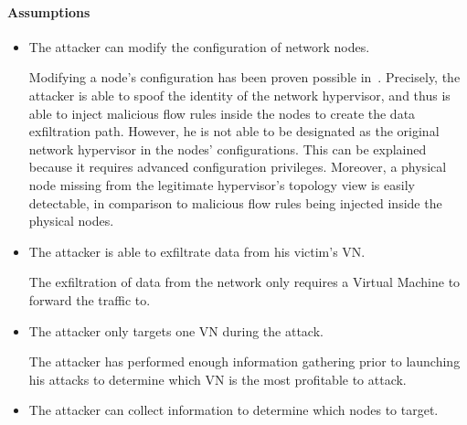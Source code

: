 \paragraph{Assumptions}
\begin{itemize}
    \item The attacker can modify the configuration of network nodes.
    
    Modifying a node's configuration has been proven  possible in~\cite{Taxonomy_Hizver2015, Bokani2015, attain-Ujcich2017}. Precisely, the attacker is able to spoof the identity of the network hypervisor, and thus is able to inject malicious flow rules inside the nodes to create the data exfiltration path. 
    However, he is not able to be designated as the original network hypervisor in the nodes' configurations. 
    This can be explained because it requires advanced configuration privileges. Moreover, a physical node missing from the legitimate hypervisor's topology view is easily detectable, in comparison to malicious flow rules being injected inside the physical nodes.
    
    \item The attacker is able to exfiltrate data from his victim's VN.
    
    The exfiltration of data from the network only requires a Virtual Machine to forward the traffic to.
    
    \item The attacker only targets one VN during the attack. 
    
     The attacker has performed enough information gathering prior to launching his attacks  to determine which VN is the most profitable to attack.
     
    
    \item The attacker can collect information to determine which nodes to target.
    

\end{itemize}
